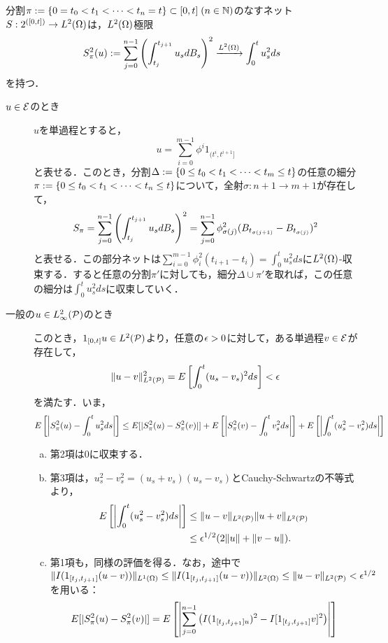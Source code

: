 \documentclass[uplatex,dvipdfmx]{jsreport}
\begin{document}
\begin{proposition}[二次変分]
    分割$\pi:=\{0=t_0<t_1<\cdots<t_n=t\}\subset[0,t]\;(n\in\N)$のなすネット$S:2^{([0,t])}\to L^2(\Om)$は，$L^2(\Om)$極限
    \[S^2_\pi(u):=\sum^{n-1}_{j=0}\paren{\int^{t_{j+1}}_{t_j}u_sdB_s}^2\xrightarrow{L^2(\Om)}\int^t_0u^2_sds\]
    を持つ．
\end{proposition}
\begin{Proof}\mbox{}
    \begin{description}
        \item[$u\in\E$のとき] 
        $u$を単過程とすると，
        \[u=\sum^{m-1}_{i=0}\phi^i1_{(t^i,t^{i+1}]}\]
        と表せる．このとき，分割$\Delta:=\Brace{0\le t_0<t_1<\cdots<t_m\le t}$の任意の細分$\pi:=\Brace{0\le t_0<t_1<\cdots<t_n\le t}$について，全射$\sigma:n+1\to m+1$が存在して，
        \[S_\pi=\sum^{n-1}_{j=0}\paren{\int^{t_{j+1}}_{t_j}u_sdB_s}^2=\sum^{n-1}_{j=0}\phi_{\sigma(j)}^2(B_{t_{\sigma(j+1)}}-B_{t_{\sigma(j)}})^2\]
        と表せる．この部分ネットは$\sum^{m-1}_{i=0}\phi_i^2(t_{i+1}-t_i)=\int^t_0u^2_sds$に$L^2(\Om)$-収束する．すると任意の分割$\pi'$に対しても，細分$\Delta\cup\pi'$を取れば，この任意の細分は$\int^t_0u^2_sds$に収束していく．
        \item[一般の$u\in L^2_\infty(\P)$のとき]
        このとき，$1_{[0,t]}u\in L^2(\P)$より，任意の$\ep>0$に対して，ある単過程$v\in\E$が存在して，
        \[\norm{u-v}^2_{L^2(\P)}=E\Square{\int^t_0(u_s-v_s)^2ds}<\ep\]
        を満たす．いま，
        \[E\Square{\Abs{S^2_\pi(u)-\int^t_0u^2_sds}}\le E[\abs{S^2_\pi(u)-S^2_\pi(v)}]+E\Square{\Abs{S^2_\pi(v)-\int^t_0v^2_sds}}+E\Square{\Abs{\int^t_0(u_s^2-v_s^2)ds}}\]
        \begin{enumerate}[(a)]
            \item 第2項は$0$に収束する．
            \item 第3項は，$u_s^2-v_s^2=(u_s+v_s)(u_s-v_s)$とCauchy-Schwartzの不等式より，
            \begin{align*}
                E\Square{\Abs{\int^t_0(u_s^2-v_s^2)ds}}&\le\norm{u-v}_{L^2(\P)}\norm{u+v}_{L^2(\P)}\\
                &\le\ep^{1/2}(2\norm{u}+\norm{v-u}).
            \end{align*}
            \item 第1項も，同様の評価を得る．なお，途中で$\norm{I(1_{[t_j,t_{j+1}]}(u-v))}_{L^1(\Om)}\le\norm{I(1_{[t_j,t_{j+1}]}(u-v))}_{L^2(\Om)}\le\norm{u-v}_{L^2(\P)}<\ep^{1/2}$を用いる：
            \begin{align*}
                E[\abs{S^2_\pi(u)-S^2_\pi(v)}]&=E\Square{\Abs{\sum^{n-1}_{j=0}\paren{I(1_{[t_j,t_{j+1}]u})^2-I[1_{[t_j,t_{j+1}]}v]^2}}}\\

\end{align*}
\end{enumerate}
\end{description}
\end{Proof}
\end{document}

